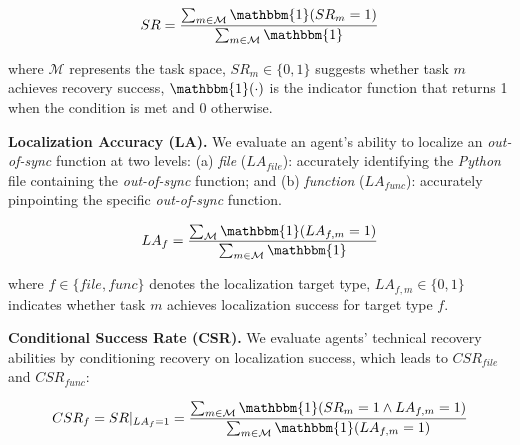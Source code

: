{
\vspace{-1.0em}
\small
\begin{equation}
SR = \frac{\sum_{m \in \mathcal{M}} \mathbbm{1}(SR_m = 1)}{\sum_{m \in \mathcal{M}} \mathbbm{1}}
\label{Eq: Evaluation Metric 1 (SR)}
\end{equation}
\vspace{-1.8em}
}

{\small
where $\mathcal{M}$ represents the task space, $SR_m \in \{0,1\}$ suggests whether task $m$ achieves recovery success, $\mathbbm{1}(\cdot)$ is the indicator function that returns 1 when the condition is met and 0 otherwise.
}



\textbf{Localization Accuracy (LA).}
We evaluate an agent's ability to localize an \textit{out-of-sync} function at two levels: (a) \textit{file} ($LA_{file}$): accurately identifying the \textit{Python} file containing the \textit{out-of-sync} function; and (b) \textit{function} ($LA_{func}$): accurately pinpointing the specific \textit{out-of-sync} function.

{
\vspace{-0.5em}
\small
\begin{equation}
LA_f = \frac{\sum_{\mathcal{M}} \mathbbm{1}(LA_{f,m} = 1)}{\sum_{m \in \mathcal{M}} \mathbbm{1}}
\label{Eq: Evaluation Metric 2 (LA)}
\end{equation}
\vspace{-1.8em}
}


{\small
where $f \in \{file, func\}$ denotes the localization target type, $LA_{f,m} \in \{0,1\}$ indicates whether task $m$ achieves localization success for target type $f$.
}



\textbf{Conditional Success Rate (CSR).}
We evaluate agents' technical recovery abilities by conditioning recovery on localization success, which leads to $CSR_{file}$ and $CSR_{func}$:

{
\vspace{-1em}
\small
\begin{equation}
CSR_f = SR|_{LA_f=1} = \frac{\sum_{m \in \mathcal{M}} \mathbbm{1}(SR_m=1 \land LA_{f,m}=1)}{\sum_{m \in \mathcal{M}} \mathbbm{1}(LA_{f,m}=1)}
\label{Eq: Evaluation Metric 3 (CSR)}
\end{equation}
\vspace{-2em}
}

